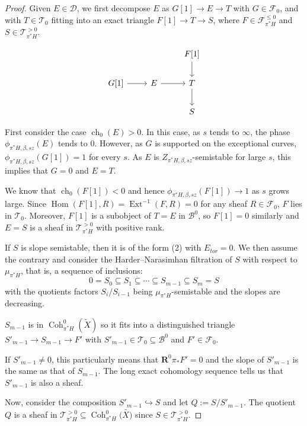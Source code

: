 \documentclass[12pt]{amsart}
\theoremstyle{definition}
\DeclareMathOperator{\Hom}{Hom}
\DeclareMathOperator{\Ext}{Ext}
\DeclareMathOperator{\Coh}{Coh}
\DeclareMathOperator{\ch}{ch}
\begin{document}
\begin{proof}
Given $E \in \mathcal{D}$, we first decompose $E$ as $G[1] \longrightarrow E \longrightarrow T$ with $G \in \mathcal{F}_0$,
and with $T \in \mathcal{T}_0$ fitting into an exact triangle $F[1] \longrightarrow T \longrightarrow S$, 
where $F \in \mathcal{F}^{\leq 0}_{\pi^\ast H}$ and $S \in \mathcal{T}^{> 0}_{\pi^\ast H}$.

\[\begin{tikzcd}
                 &             & {F[1]} \arrow[d] \\
{G[1]} \arrow[r] & E \arrow[r] & T \arrow[d]      \\
                 &             & S               
\end{tikzcd}\]

First consider the case $\ch_0(E)>0$.
In this case, as $s$ tends to $\infty$, the phase $\phi_{\pi^\ast H,\beta,sz}(E)$ tends to $0$.
However, as $G$ is supported on the exceptional curves, $\phi_{\pi^\ast H,\beta,sz}(G[1])=1$ for every $s$.
As $E$ is $Z_{\pi^\ast H,\beta,sz}$-semistable for large $s$, this implies that $G=0$ and $E = T$.

We know that $\ch_0(F[1])<0$ and hence $\phi_{\pi^\ast H,\beta,sz}(F[1]) \rightarrow 1$ as $s$ grows large.
Since $\Hom(F[1],R)=\Ext^{-1}(F,R)=0$ for any sheaf $R \in \mathcal{F}_0$,
$F$ lies in $\mathcal{T}_0$.
Moreover, $F[1]$ is a subobject of $T=E$ in $\mathcal{B}^0$,
so $F[1]=0$ similarly and $E=S$ is a sheaf in $\mathcal{T}^{> 0}_{\pi^\ast H}$ with positive rank.

If $S$ is slope semistable, then it is  of the form (2) with $E_{tor}=0$.
We then assume the contrary and consider the Harder--Narasimhan filtration of $S$ with respect to $\mu_{\pi^\ast H}$, that is, a sequence of inclusions:
$$ 0 = S_0 \subseteq S_1 \subseteq \cdots  \subseteq S_{m-1} \subseteq S_m=S $$
with the quotients factors $S_i/S_{i-1}$ being $\mu_{\pi^\ast H}$-semistable and the slopes are decreasing.

$S_{m-1}$ is in $\Coh^0_{\pi^\ast H}(\widetilde{X})$ so it fits into a distinguished triangle $S'_{m-1} \longrightarrow S_{m-1} \longrightarrow F'$ with $S'_{m-1} \in \mathcal{T}_0\subseteq \mathcal{B}^0$ and $F' \in \mathcal{F}_0$.

If $S'_{m-1}\neq 0$, this particularly means that $\mathbf{R}^0\pi_\ast F'=0$ and the slope of $S'_{m-1}$ is the same as that of $S_{m-1}$.
The long exact cohomology sequence tells us that $S'_{m-1}$ is also a sheaf.

Now, consider the composition $S'_{m-1} \hookrightarrow S$ and let $Q:=S/S'_{m-1}$.
The quotient $Q$ is a sheaf in $\mathcal{T}^{>0}_{\pi^\ast H}\subseteq \Coh^0_{\pi^\ast H}(\widetilde{X)}$ since $S \in \mathcal{T}^{> 0}_{\pi^\ast H}$.


\end{proof}
\end{document}
